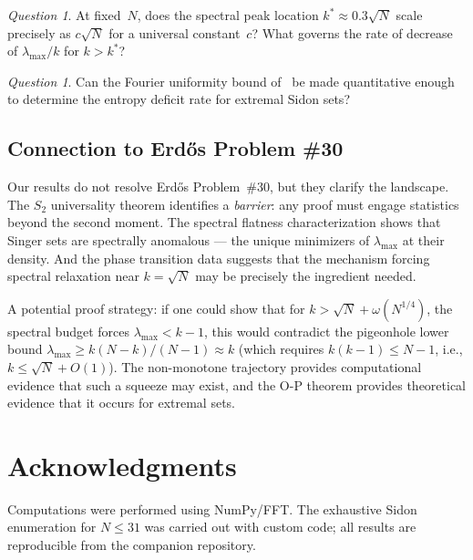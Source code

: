 \documentclass[11pt]{article}
\theoremstyle{definition}
\theoremstyle{remark}
\newtheorem{question}[theorem]{Question}
\newcommand{\lmax}{\lambda_{\max}}
\begin{document}
\begin{question}\label{q:relaxation-rate}
At fixed~$N$, does the spectral peak location $k^* \approx 0.3\sqrt{N}$
scale precisely as $c\sqrt{N}$ for a universal constant~$c$?
What governs the rate of decrease of $\lmax/k$ for $k > k^*$?
\end{question}

\begin{question}\label{q:quantitative-OP}
Can the Fourier uniformity bound of~\cite{OP2021} be made
quantitative enough to determine the entropy deficit rate for
extremal Sidon sets?
\end{question}

\subsection{Connection to Erd\H{o}s Problem \#30}

Our results do not resolve Erd\H{o}s Problem~\#30, but they
clarify the landscape.  The $S_2$ universality theorem
identifies a \emph{barrier}: any proof must engage statistics
beyond the second moment.  The spectral flatness characterization
shows that Singer sets are spectrally anomalous --- the unique
minimizers of $\lmax$ at their density.  And the phase transition
data suggests that the mechanism forcing spectral relaxation near
$k = \sqrt{N}$ may be precisely the ingredient needed.

A potential proof strategy: if one could show that for
$k > \sqrt{N} + \omega(N^{1/4})$, the spectral budget forces
$\lmax < k - 1$, this would contradict the pigeonhole lower
bound $\lmax \ge k(N-k)/(N-1) \approx k$ (which requires
$k(k-1) \le N-1$, i.e., $k \le \sqrt{N} + O(1)$).  The
non-monotone trajectory provides computational evidence that
such a squeeze may exist, and the O-P theorem provides
theoretical evidence that it occurs for extremal sets.

\section*{Acknowledgments}

Computations were performed using NumPy/FFT.
The exhaustive Sidon enumeration for $N \le 31$ was carried out
with custom code; all results are reproducible from the
companion repository.
\end{document}
